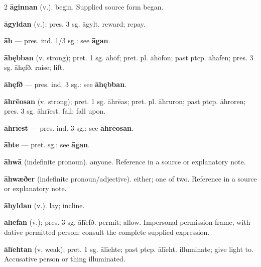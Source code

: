 \begin{multicols*}{2}
\textbf{āginnan} (v.). begin. Supplied source form began.\par
\textbf{āgyldan} (v.); pres. 3 sg. āgylt. reward; repay.\par
\textbf{āh} — pres. ind. 1/3 sg.: see \textbf{āgan}.\par
\textbf{āhębban} (v. strong); pret. 1 sg. āhōf; pret. pl. āhōfon; past ptcp. āhafen; pres. 3 sg. āhęfð. raise; lift.\par
\textbf{āhęfð} — pres. ind. 3 sg.: see \textbf{āhębban}.\par
\textbf{āhrēosan} (v. strong); pret. 1 sg. āhrēas; pret. pl. āhruron; past ptcp. āhroren; pres. 3 sg. āhrīest. fall; fall upon.\par
\textbf{āhrīest} — pres. ind. 3 sg.: see \textbf{āhrēosan}.\par
\textbf{āhte} — pret. sg.: see \textbf{āgan}.\par
\textbf{āhwā} (indefinite pronoun). anyone. Reference in a source or explanatory note.\par
\textbf{āhwæðer} (indefinite pronoun/adjective). either; one of two. Reference in a source or explanatory note.\par
\textbf{āhyldan} (v.). lay; incline.\par
\textbf{ālīefan} (v.); pres. 3 sg. ālīefð. permit; allow. Impersonal permission frame, with dative permitted person; consult the complete supplied expression.\par
\textbf{ālīehtan} (v. weak); pret. 1 sg. ālīehte; past ptcp. ālīeht. illuminate; give light to. Accusative person or thing illuminated.\par

\end{multicols*}
